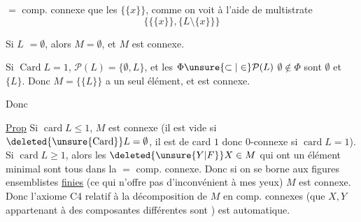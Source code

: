 $=$ comp. connexe que les $\{\{x\}\}$, comme on voit à l'aide de  multistrate
\[
\bigl\{\{\{x\}\},\{L\setminus\{x\}\}\bigr\}
\]

Si $L$  $=\emptyset$,   alors $M=\emptyset$, et $M$ est connexe.

Si $\operatorname{Card}L=1$, $\mathcal P(L)=\{\emptyset,L\}$, et les $\Phi\unsure{\subset|\in}\mathcal P(L)$     $\emptyset\notin\Phi$ sont $\emptyset$ et $\{L\}$. Donc $M=\{\{L\}\}$ a un seul élément, et est connexe.

Donc

\uline{Prop} Si $\operatorname{card}L\leq1$, $M$ est connexe (il est vide si $\deleted{\unsure{\mathrm{Card}}}L=\emptyset$, il est de card $1$ donc $0$-connexe si $\operatorname{card}L=1$). Si $\operatorname{card}L\geq1$, alors les $\deleted{\unsure{Y|F}}X\in M$ qui ont un élément minimal sont tous dans la $=$ comp. connexe. Donc si on se borne aux  figures ensemblistes \uline{finies} (ce qui n'offre pas d'inconvénient à mes yeux) $M$ est connexe. Donc l'axiome C4  relatif à la décomposition de $M$ en comp. connexes (que $X,Y$ appartenant à des composantes différentes sont ) est automatique.
